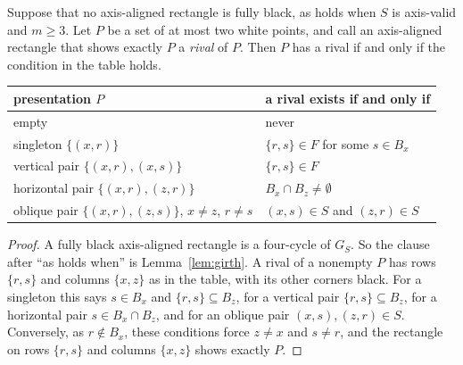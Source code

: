 \begin{lemma}\label{lem:rival}
Suppose that no axis-aligned rectangle is fully black, as holds when $S$ is axis-valid and $m\ge3$. Let $P$ be a set of at most two white points, and call an axis-aligned rectangle that shows exactly $P$ a \emph{rival} of $P$. Then $P$ has a rival if and only if the condition in the table holds.
\begin{center}
\small
\begin{tabular}{@{}ll@{}}
\toprule
presentation $P$ & a rival exists if and only if\\
\midrule
empty & never\\
singleton $\{(x,r)\}$ & $\{r,s\}\in F$ for some $s\in B_x$\\
vertical pair $\{(x,r),(x,s)\}$ & $\{r,s\}\in F$\\
horizontal pair $\{(x,r),(z,r)\}$ & $B_x\cap B_z\ne\emptyset$\\
oblique pair $\{(x,r),(z,s)\}$, $x\ne z$, $r\ne s$ & $(x,s)\in S$ and $(z,r)\in S$\\
\bottomrule
\end{tabular}
\end{center}
\end{lemma}

\begin{proof}
A fully black axis-aligned rectangle is a four-cycle of $G_S$. So the clause after ``as holds when'' is Lemma~\ref{lem:girth}.
 A rival of a nonempty $P$ has rows $\{r,s\}$ and columns $\{x,z\}$ as in the table, with its other corners black. For a singleton this says $s\in B_x$ and $\{r,s\}\subseteq B_z$, for a vertical pair $\{r,s\}\subseteq B_z$, for a horizontal pair $s\in B_x\cap B_z$, and for an oblique pair $(x,s),(z,r)\in S$. Conversely, as $r\notin B_x$, these conditions force $z\ne x$ and $s\ne r$, and the rectangle on rows $\{r,s\}$ and columns $\{x,z\}$ shows exactly $P$.
\end{proof}
